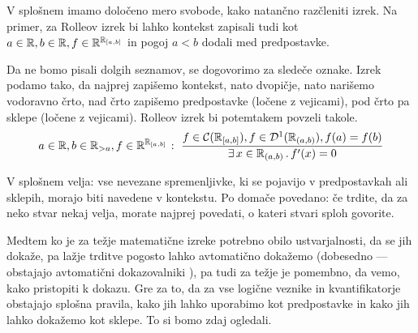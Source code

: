 	V splošnem imamo določeno mero svobode, kako natančno razčleniti izrek. Na primer, za Rolleov izrek bi lahko kontekst zapisali tudi kot $a \in \mathbb{R}, b \in \mathbb{R}, f \in \mathbb{R}^{{\mathbb{R}}_{[a, b]}}$ in pogoj $a < b$ dodali med predpostavke.
	
	Da ne bomo pisali dolgih seznamov, se dogovorimo za sledeče oznake. Izrek podamo tako, da najprej zapišemo kontekst, nato dvopičje, nato narišemo vodoravno črto, nad črto zapišemo predpostavke (ločene z vejicami), pod črto pa sklepe (ločene z vejicami). Rolleov izrek bi potemtakem povzeli takole.
	\[\claim{a \in \RR, b \in \RR_{> a}, f \in \RR^{\intcc{a}{b}}}{f \in \mathcal{C}(\intcc{a}{b}), f \in \mathcal{D}^1(\intoo{a}{b}), f(a) = f(b)}{\xsome{x}[\intoo{a}{b}]{f'(x) = 0}}\]
	
	V splošnem velja: vse nevezane spremenljivke, ki se pojavijo v predpostavkah ali sklepih, morajo biti navedene v kontekstu. Po domače povedano: če trdite, da za neko stvar nekaj velja, morate najprej povedati, o kateri stvari sploh govorite.
	
	Medtem ko je za težje matematične izreke potrebno obilo ustvarjalnosti, da se jih dokaže, pa lažje trditve pogosto lahko avtomatično dokažemo (dobesedno --- obstajajo avtomatični dokazovalniki ), pa tudi za težje je pomembno, da vemo, kako pristopiti k dokazu. Gre za to, da za vse logične veznike in kvantifikatorje obstajajo splošna pravila, kako jih lahko uporabimo kot predpostavke in kako jih lahko dokažemo kot sklepe. To si bomo zdaj ogledali.
	
